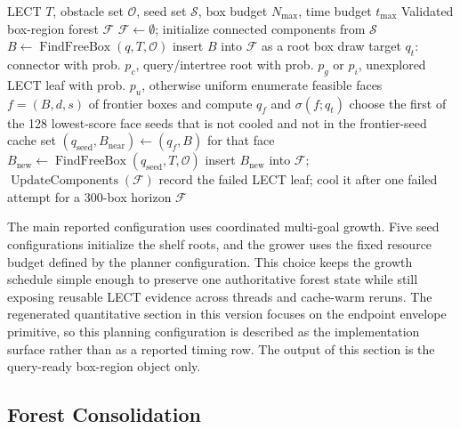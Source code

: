 \documentclass[journal]{IEEEtran}
\newcommand{\calO}{\ensuremath{\mathcal{O}}}
\newcommand{\procname}[1]{\operatorname{#1}}
\begin{document}
\begin{algorithm}[t]
\caption{GrowForest: budgeted expansion of a connected box-region forest.}
\label{alg:forest_growth}
\footnotesize
\begin{algorithmic}[1]
\REQUIRE LECT $T$, obstacle set $\calO$, seed set $\mathcal{S}$, box budget $N_{\max}$, time budget $t_{\max}$
\ENSURE Validated box-region forest $\mathcal{F}$
\STATE $\mathcal{F} \gets \emptyset$; initialize connected components from $\mathcal{S}$
  \STATE $B \gets \procname{FindFreeBox}(q, T, \calO)$
    \STATE insert $B$ into $\mathcal{F}$ as a root box
  \ENDIF
\ENDFOR
{}
  \STATE draw target $q_t$: connector with prob. $p_c$, query/intertree root with prob. $p_g$ or $p_i$, unexplored LECT leaf with prob. $p_u$, otherwise uniform
  \STATE enumerate feasible faces $f=(B,d,s)$ of frontier boxes and compute $q_f$ and $\sigma(f;q_t)$
  \STATE choose the first of the 128 lowest-score face seeds that is not cooled and not in the frontier-seed cache
  \STATE set $(q_{\mathrm{seed}},B_{\mathrm{near}}) \gets (q_f,B)$ for that face
  \STATE $B_{\mathrm{new}} \gets \procname{FindFreeBox}(q_{\mathrm{seed}}, T, \calO)$
  \IF{$B_{\mathrm{new}} \neq \emptyset$ and $\procname{BoxesConnected}(B_{\mathrm{new}},B_{\mathrm{near}},\tau)$}
    \STATE insert $B_{\mathrm{new}}$ into $\mathcal{F}$; $\procname{UpdateComponents}(\mathcal{F})$
  \ELSE
    \STATE record the failed LECT leaf; cool it after one failed attempt for a 300-box horizon
  \ENDIF
\ENDWHILE
\RETURN $\mathcal{F}$
\end{algorithmic}
\end{algorithm}

The main reported configuration uses coordinated multi-goal growth. Five seed
configurations initialize the shelf roots, and the grower uses the fixed
resource budget defined by the planner configuration. This choice keeps the
growth schedule simple enough to preserve one authoritative forest state while
still exposing reusable LECT evidence across threads and cache-warm reruns. The
regenerated quantitative section in this version focuses on the endpoint
envelope primitive, so this planning configuration is described as the
implementation surface rather than as a reported timing row. The output of this
section is the query-ready box-region object only.

\subsection{Forest Consolidation}\label{sec:forest_consolidation}
\end{document}

